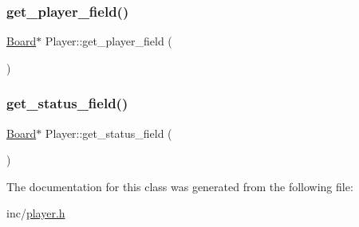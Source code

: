 \subsubsection{\texorpdfstring{get\_player\_field()}{get\_player\_field()}}
{\footnotesize\ttfamily \mbox{\hyperlink{classBoard}{Board}}$\ast$ Player\+::get\+\_\+player\+\_\+field (\begin{DoxyParamCaption}{ }\end{DoxyParamCaption})}

\mbox{\label{classPlayer_ae0cd4745537a2223771686c65f7acf9d}} 
\subsubsection{\texorpdfstring{get\_status\_field()}{get\_status\_field()}}
{\footnotesize\ttfamily \mbox{\hyperlink{classBoard}{Board}}$\ast$ Player\+::get\+\_\+status\+\_\+field (\begin{DoxyParamCaption}{ }\end{DoxyParamCaption})}



The documentation for this class was generated from the following file\+:\begin{DoxyCompactItemize}
\item 
inc/\mbox{\hyperlink{player_8h}{player.\+h}}\end{DoxyCompactItemize}
